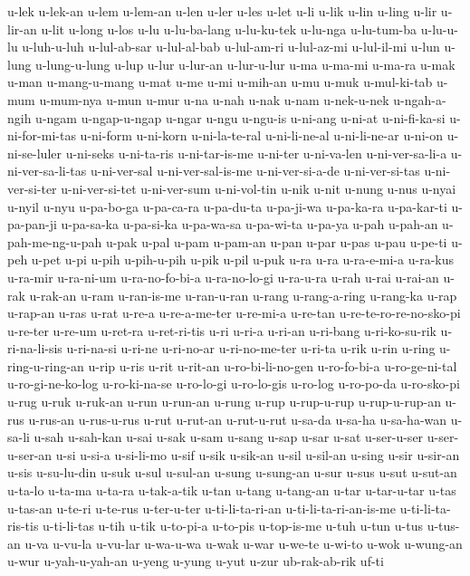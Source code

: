 {u-lek u-lek-an u-lem u-lem-an u-len u-ler u-les u-let u-li u-lik u-lin
u-ling u-lir u-lir-an u-lit u-long u-los u-lu u-lu-ba-lang u-lu-ku-tek
u-lu-nga u-lu-tum-ba u-lu-u-lu u-luh-u-luh u-lul-ab-sar u-lul-al-bab
u-lul-am-ri u-lul-az-mi u-lul-il-mi u-lun u-lung u-lung-u-lung u-lup u-lur
u-lur-an u-lur-u-lur u-ma u-ma-mi u-ma-ra u-mak u-man u-mang-u-mang u-mat
u-me u-mi u-mih-an u-mu u-muk u-mul-ki-tab u-mum u-mum-nya u-mun u-mur
u-na u-nah u-nak u-nam u-nek-u-nek u-ngah-a-ngih u-ngam u-ngap-u-ngap
u-ngar u-ngu u-ngu-is u-ni-ang u-ni-at u-ni-fi-ka-si u-ni-for-mi-tas
u-ni-form u-ni-korn u-ni-la-te-ral u-ni-li-ne-al u-ni-li-ne-ar u-ni-on
u-ni-se-luler u-ni-seks u-ni-ta-ris u-ni-tar-is-me u-ni-ter u-ni-va-len
u-ni-ver-sa-li-a u-ni-ver-sa-li-tas u-ni-ver-sal u-ni-ver-sal-is-me
u-ni-ver-si-a-de u-ni-ver-si-tas u-ni-ver-si-ter u-ni-ver-si-tet
u-ni-ver-sum u-ni-vol-tin u-nik u-nit u-nung u-nus u-nyai u-nyil u-nyu
u-pa-bo-ga u-pa-ca-ra u-pa-du-ta u-pa-ji-wa u-pa-ka-ra u-pa-kar-ti
u-pa-pan-ji u-pa-sa-ka u-pa-si-ka u-pa-wa-sa u-pa-wi-ta u-pa-ya u-pah
u-pah-an u-pah-me-ng-u-pah u-pak u-pal u-pam u-pam-an u-pan u-par u-pas
u-pau u-pe-ti u-peh u-pet u-pi u-pih u-pih-u-pih u-pik u-pil u-puk u-ra
u-ra u-ra-e-mi-a u-ra-kus u-ra-mir u-ra-ni-um u-ra-no-fo-bi-a
u-ra-no-lo-gi u-ra-u-ra u-rah u-rai u-rai-an u-rak u-rak-an u-ram
u-ran-is-me u-ran-u-ran u-rang u-rang-a-ring u-rang-ka u-rap u-rap-an
u-ras u-rat u-re-a u-re-a-me-ter u-re-mi-a u-re-tan
u-re-te-ro-re-no-sko-pi u-re-ter u-re-um u-ret-ra u-ret-ri-tis u-ri u-ri-a
u-ri-an u-ri-bang u-ri-ko-su-rik u-ri-na-li-sis u-ri-na-si u-ri-ne
u-ri-no-ar u-ri-no-me-ter u-ri-ta u-rik u-rin u-ring u-ring-u-ring-an
u-rip u-ris u-rit u-rit-an u-ro-bi-li-no-gen u-ro-fo-bi-a u-ro-ge-ni-tal
u-ro-gi-ne-ko-log u-ro-ki-na-se u-ro-lo-gi u-ro-lo-gis u-ro-log u-ro-po-da
u-ro-sko-pi u-rug u-ruk u-ruk-an u-run u-run-an u-rung u-rup u-rup-u-rup
u-rup-u-rup-an u-rus u-rus-an u-rus-u-rus u-rut u-rut-an u-rut-u-rut
u-sa-da u-sa-ha u-sa-ha-wan u-sa-li u-sah u-sah-kan u-sai u-sak u-sam
u-sang u-sap u-sar u-sat u-ser-u-ser u-ser-u-ser-an u-si u-si-a u-si-li-mo
u-sif u-sik u-sik-an u-sil u-sil-an u-sing u-sir u-sir-an u-sis
u-su-lu-din u-suk u-sul u-sul-an u-sung u-sung-an u-sur u-sus u-sut
u-sut-an u-ta-lo u-ta-ma u-ta-ra u-tak-a-tik u-tan u-tang u-tang-an u-tar
u-tar-u-tar u-tas u-tas-an u-te-ri u-te-rus u-ter-u-ter u-ti-li-ta-ri-an
u-ti-li-ta-ri-an-is-me u-ti-li-ta-ris-tis u-ti-li-tas u-tih u-tik
u-to-pi-a u-to-pis u-top-is-me u-tuh u-tun u-tus u-tus-an u-va u-vu-la
u-vu-lar u-wa-u-wa u-wak u-war u-we-te u-wi-to u-wok u-wung-an u-wur
u-yah-u-yah-an u-yeng u-yung u-yut u-zur ub-rak-ab-rik uf-ti
}
